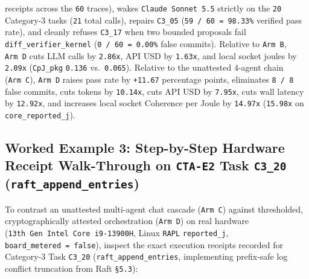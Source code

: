 \documentclass[10pt,letterpaper]{article}
\begin{document}
\begin{enumerate}
  receipts across the \texttt{60} traces), wakes
  \texttt{Claude\ Sonnet\ 5.\allowbreak{}5} strictly on the \texttt{20} Category-3
  tasks (\texttt{21} total calls), repairs \texttt{C3\_05}
  (\texttt{59\ /\allowbreak{}\ 60\ =\ 98.\allowbreak{}33\%} verified pass rate), and cleanly
  refuses \texttt{C3\_17} when two bounded proposals fail
  \texttt{diff\_\allowbreak{}verifier\_\allowbreak{}kernel} (\texttt{0\ /\allowbreak{}\ 60\ =\ 0.\allowbreak{}00\%} false
  commits). Relative to \texttt{Arm\ B}, \texttt{Arm\ D} cuts LLM calls
  by \texttt{2.86x}, API USD by \texttt{1.63x}, and local socket joules
  by \texttt{2.09x} (\texttt{CpJ\_pkg} \texttt{0.136}
  vs.~\texttt{0.065}). Relative to the unattested 4-agent chain
  (\texttt{Arm\ C}), \texttt{Arm\ D} raises pass rate by \texttt{+11.67}
  percentage points, eliminates \texttt{8\ /\ 8} false commits, cuts
  tokens by \texttt{10.14x}, cuts API USD by \texttt{7.95x}, cuts wall
  latency by \texttt{12.92x}, and increases local socket Coherence per
  Joule by \texttt{14.97x} (\texttt{15.98x} on
  \texttt{core\_\allowbreak{}reported\_\allowbreak{}j}).
\end{enumerate}

\subsection{\texorpdfstring{Worked Example 3: Step-by-Step Hardware
Receipt Walk-Through on \texttt{CTA-E2} Task \texttt{C3\_20}
(\texttt{raft\_\allowbreak{}append\_\allowbreak{}entries})}{Worked Example 3: Step-by-Step Hardware Receipt Walk-Through on CTA-E2 Task C3\_20 (raft\_append\_entries)}}\label{worked-example-3-step-by-step-hardware-receipt-walk-through-on-cta-e2-task-c3_20-raft_append_entries}

To contrast an unattested multi-agent chat cascade (\texttt{Arm\ C})
against thresholded, cryptographically attested orchestration
(\texttt{Arm\ D}) on real hardware
(\texttt{13th\ Gen\ Intel\ Core\ i9-\allowbreak{}13900H}, Linux \texttt{RAPL}
\texttt{reported\_\allowbreak{}j}, \texttt{board\_\allowbreak{}metered\ =\ false}), inspect the
exact execution receipts recorded for Category-3 Task \texttt{C3\_20}
(\texttt{raft\_\allowbreak{}append\_\allowbreak{}entries}, implementing prefix-safe log conflict
truncation from Raft \texttt{§5.3}):
\end{document}
